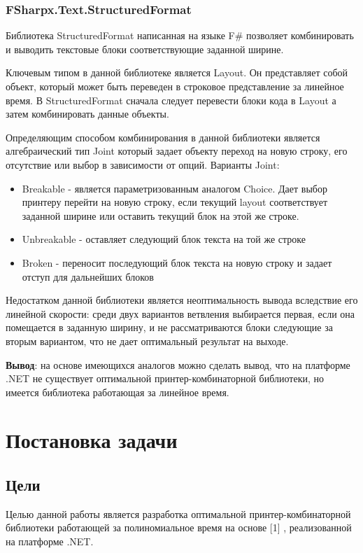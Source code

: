 \documentclass{matmex-diploma}
\begin{document}
\subsubsection{FSharpx.Text.StructuredFormat}
Библиотека StructuredFormat написанная на языке F\# позволяет комбинировать и выводить текстовые блоки соответствующие заданной ширине.

Ключевым типом в данной библиотеке является Layout. Он представляет собой объект, который может быть переведен в строковое представление за линейное время.
В StructuredFormat сначала следует перевести блоки кода в Layout а затем комбинировать данные объекты.

Определяющим способом комбинирования в данной библиотеки является алгебраический тип Joint который задает объекту переход на новую строку, его отсутствие или выбор в зависимости от опций.
Варианты Joint:
\begin{itemize}
    \item Breakable - является параметризованным аналогом Choice. Дает выбор принтеру перейти на новую строку, если текущий layout соответствует заданной ширине  или оставить текущий блок на этой же строке.
    \item Unbreakable - оставляет следующий блок текста на той же строке
    \item Broken - переносит последующий блок текста на новую строку и задает отступ для дальнейших блоков
\end{itemize}
Недостатком данной библиотеки является неоптимальность вывода вследствие его линейной скорости: среди двух вариантов ветвления выбирается первая, если она помещается в заданную ширину, и не рассматриваются блоки следующие за вторым вариантом, что не дает оптимальный результат на выходе.

\textbf{Вывод}: на основе имеющихся аналогов можно сделать вывод, что на платформе .NET не существует оптимальной принтер-комбинаторной библиотеки, но имеется библиотека работающая за линейное время.
\section{Постановка задачи}
\subsection{Цели}Целью данной работы является разработка оптимальной принтер-комбинаторной библиотеки работающей за полиномиальное время на основе [1] , реализованной на платформе .NET.
\end{document}
